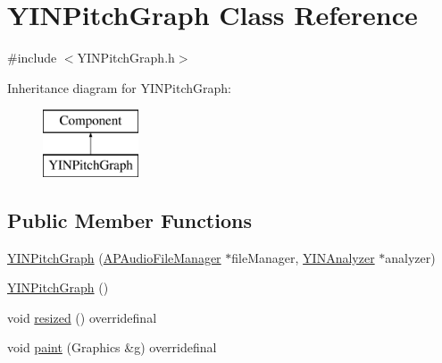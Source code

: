 \hypertarget{class_y_i_n_pitch_graph}{\section{Y\+I\+N\+Pitch\+Graph Class Reference}
\label{class_y_i_n_pitch_graph}
}


{\ttfamily \#include $<$Y\+I\+N\+Pitch\+Graph.\+h$>$}

Inheritance diagram for Y\+I\+N\+Pitch\+Graph\+:\begin{figure}[H]
\begin{center}
\leavevmode
\includegraphics[height=2.000000cm]{class_y_i_n_pitch_graph}
\end{center}
\end{figure}
\subsection*{Public Member Functions}
\begin{DoxyCompactItemize}
\item 
\hyperlink{class_y_i_n_pitch_graph_a7d4889a077f978a552c98f4961367db7}{Y\+I\+N\+Pitch\+Graph} (\hyperlink{class_a_p_audio_file_manager}{A\+P\+Audio\+File\+Manager} $\ast$file\+Manager, \hyperlink{class_y_i_n_analyzer}{Y\+I\+N\+Analyzer} $\ast$analyzer)
\item 
\hyperlink{class_y_i_n_pitch_graph_a55d8c0a35265cc9adbf4cd3ee909ba51}{Y\+I\+N\+Pitch\+Graph} ()
\item 
void \hyperlink{class_y_i_n_pitch_graph_a0fcd725ef86ecbd35c498cc98dd91c4f}{resized} () overridefinal
\item 
void \hyperlink{class_y_i_n_pitch_graph_a7388ed6a8b4c3b579a73c78e0effdb59}{paint} (Graphics \&g) overridefinal
\end{DoxyCompactItemize}


